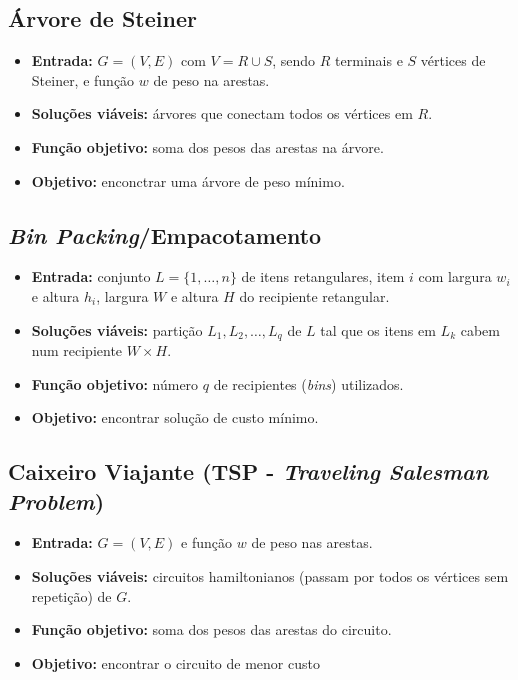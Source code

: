 \subsection{Árvore de Steiner}

\begin{itemize}
    \item \textbf{Entrada:} $G = (V, E)$ com $V = R \cup S$, sendo $R$ terminais e $S$ vértices de Steiner, e função $w$ de peso na arestas.
    \item \textbf{Soluções viáveis:} árvores que conectam todos os vértices em $R$.
    \item \textbf{Função objetivo:} soma dos pesos das arestas na árvore.
    \item \textbf{Objetivo:} enconctrar uma árvore de peso mínimo.
\end{itemize}

\subsection{\textit{Bin Packing}/Empacotamento}

\begin{itemize}
    \item \textbf{Entrada:} conjunto $L = \{1,\dots,n\}$ de itens retangulares, item $i$ com largura $w_i$ e altura $h_i$, largura $W$ e altura $H$ do recipiente retangular.
    \item \textbf{Soluções viáveis:} partição $L_1, L_2, \dots, L_q$ de $L$ tal que os itens em $L_k$ cabem num recipiente $W \times H$.
    \item \textbf{Função objetivo:} número $q$ de recipientes (\textit{bins}) utilizados.
    \item \textbf{Objetivo:} encontrar solução de custo mínimo.
\end{itemize}

\subsection{Caixeiro Viajante (TSP - \textit{Traveling Salesman Problem})}

\begin{itemize}
    \item \textbf{Entrada:} $G = (V, E)$ e função $w$ de peso nas arestas.
    \item \textbf{Soluções viáveis:} circuitos hamiltonianos (passam por todos os vértices sem repetição) de $G$.
    \item \textbf{Função objetivo:} soma dos pesos das arestas do circuito.
    \item \textbf{Objetivo:} encontrar o circuito de menor custo
\end{itemize}


